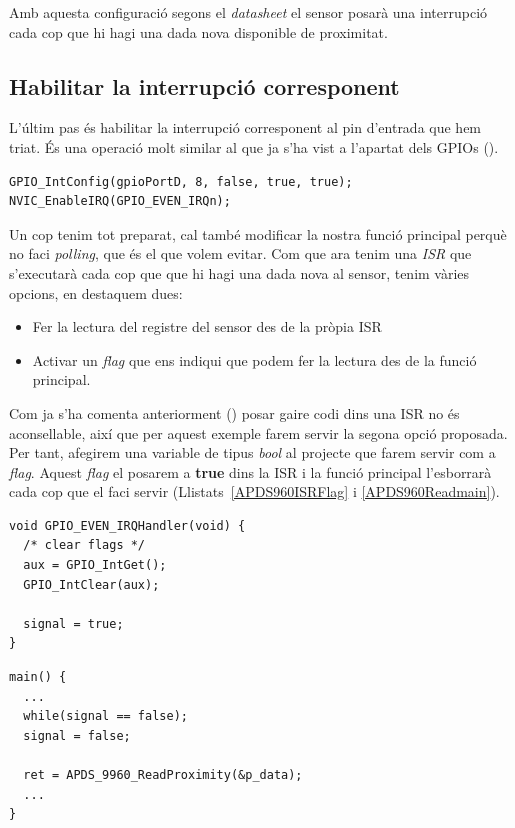 Amb aquesta configuració segons el {\em datasheet} el sensor posarà una interrupció cada cop que hi hagi una dada nova disponible de proximitat.

\subsection{Habilitar la interrupció corresponent}
L'últim pas és habilitar la interrupció corresponent al pin d'entrada que hem triat. És una operació molt similar al que ja s'ha vist a l'apartat dels GPIOs ().

\begin{lstlisting}[caption={Habilitar l'interrupció del pin corresponent},style=customc,label=APDS960EnableIRQ]
GPIO_IntConfig(gpioPortD, 8, false, true, true);
NVIC_EnableIRQ(GPIO_EVEN_IRQn);
\end{lstlisting}

Un cop tenim tot preparat, cal també modificar la nostra funció principal perquè no faci {\em polling}, que és el que volem evitar. Com que ara tenim una {\em ISR} que s'executarà cada cop que que hi hagi una dada nova al sensor, tenim vàries opcions, en destaquem dues:
\begin{itemize}
 \item Fer la lectura del registre del sensor des de la pròpia \gls{ISR}
 \item Activar un {\em flag} que ens indiqui que podem fer la lectura des de la funció principal.
\end{itemize}

Com ja s'ha comenta anteriorment () posar gaire codi dins una \gls{ISR} no és aconsellable, així que per aquest exemple farem servir la segona opció proposada. Per tant, afegirem una variable de tipus {\em bool} al projecte que farem servir com a {\em flag}. Aquest {\em flag} el posarem a {\bf true} dins la \gls{ISR} i la funció principal l'esborrarà cada cop que el faci servir (Llistats~\ref{APDS960ISRFlag} i \ref{APDS960Readmain}).

\begin{lstlisting}[caption={\gls{ISR} amb el {\em flag}},style=customc,label=APDS960ISRFlag]
void GPIO_EVEN_IRQHandler(void) {
  /* clear flags */
  aux = GPIO_IntGet();
  GPIO_IntClear(aux);

  signal = true;
}
\end{lstlisting}
\begin{lstlisting}[caption={Funció principal amb suport d'interrupcions},style=customc,label=APDS960Readmain]
main() {
  ...
  while(signal == false);
  signal = false;

  ret = APDS_9960_ReadProximity(&p_data);
  ...
}
\end{lstlisting}

